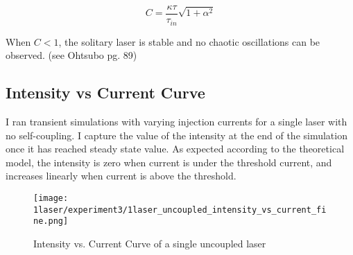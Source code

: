 \documentclass[11pt,letterpaper]{article}
\begin{document}
\begin{equation}
C = \frac{\kappa \tau}{\tau_{in}} \sqrt{1 + \alpha^2}
\end{equation}

When $C < 1$, the solitary laser is stable and no chaotic oscillations can be observed. (see Ohtsubo pg. 89)

\subsection{Intensity vs Current Curve}

I ran transient simulations with varying injection currents for a single laser with no self-coupling. I capture the value of the intensity at the end of the simulation once it has reached steady state value. As expected according to the theoretical model, the intensity is zero when current is under the threshold current, and increases linearly when current is above the threshold.

\begin{figure}[H]
\centering
\texttt{[image: 1laser/experiment3/1laser\_uncoupled\_intensity\_vs\_current\_fine.png]}
\caption{Intensity vs. Current Curve of a single uncoupled laser\label{intensitycurveuncoupled}}
\end{figure}

 
\end{document}
